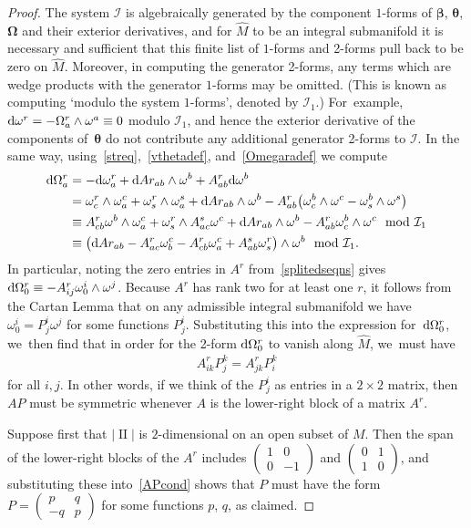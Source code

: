 \documentclass[pdftex]{sigma}
\def\vOmega{\boldsymbol{\Omega}}
\def\vbeta{\boldsymbol{\beta}}
\def\vtheta{\boldsymbol{\theta}}
\def\vOmega{\boldsymbol{\Omega}}
\def\II{\operatorname{II}} %
\def\I{\mathcal{I}}
\def\calI{\mathcal{I}}
\def\w{\omega}
\def\Mhat{\widehat{M}}
\numberwithin{equation}{section}
\begin{document}
\begin{proof}
The system $\calI$ is algebraically generated by the component $1$-forms of $\vbeta$, $\vtheta$, $\vOmega$ and their exterior derivatives, and for $\Mhat$ to be an integral submanifold it is necessary and sufficient that this finite list of $1$-forms and 2-forms pull back to be zero on $\Mhat$. Moreover, in computing the generator 2-forms, any terms which are wedge products with the generator $1$-forms may be omitted. (This is known as computing `modulo the system $1$-forms', denoted by $\calI_1$.) For~example, ${\rm d}\w^r = -\Omega^r_a \wedge \w^a \equiv 0$ modulo $\calI_1$, and hence the exterior derivative of the components of~$\vtheta$ do not contribute any additional generator 2-forms to $\I$. In the same way, using~\eqref{streq},~\eqref{vthetadef}, and~\eqref{Omegaradef} we compute
\begin{align*}
{\rm d} \Omega^r_a & = - {\rm d} \omega^r_a + {\rm d} Ar_{ab} \wedge \omega^b + A^r_{ab} {\rm d} \omega^b
\\
& = \omega^r_c \wedge \omega^c_a + \omega^r_s \wedge \omega^s_a + {\rm d} Ar_{ab} \wedge \omega^b - A^r_{ab} \big(\omega^b_c \wedge \omega^c - \omega^b_s \wedge \omega^s\big)
\\
& \equiv A^r_{cb} \omega^b \wedge \omega^c_a + \omega^r_s \wedge A^s_{ac} \omega^c + {\rm d} Ar_{ab} \wedge \omega^b - A^r_{ab} \omega^b_c \wedge \omega^c \mod \calI_1
\\
& \equiv \big( {\rm d} Ar_{ab} -A^r_{ac} \w^c_b -A^r_{cb} \w^c_a + A^s_{ab} \w^r_s\big) \wedge \w^b \mod \calI_1.
\end{align*}
In particular, noting the zero entries in $A^r$ from~\eqref{splitedseqns} gives ${\rm d} \Omega^r_0 \equiv -A^r_{ij} \w^i_0 \wedge \w^j$. Because $A^r$ has rank two for at least one $r$, it follows from the Cartan Lemma that on any admissible integral submanifold we have $\w^i_0= P^i_j \w^j$ for some functions $P^i_j$. Substituting this into the expression for~${\rm d} \Omega^r_0$, we~then find that in order for the 2-form ${\rm d} \Omega^r_0$ to vanish along $\Mhat$, we~must have
\begin{gather} \label{APcond}
A^r_{ik} P^k_j = A^r_{jk} P^k_i
\end{gather}
for all $i,j$. In other words, if we think of the $P^i_j$ as entries in a $2\times 2$ matrix, then $AP$ must be symmetric whenever $A$ is the lower-right block of a matrix $A^r$.

Suppose first that $|\II|$ is $2$-dimensional on an open subset of $M$. Then the span of the lower-right blocks of the $A^r$ includes $\left(\begin{smallmatrix} 1 & 0 \\ 0 & -1 \end{smallmatrix}\right)$ and $\left(\begin{smallmatrix} 0 & 1 \\ 1 & 0 \end{smallmatrix}\right)$, and substituting these into~\eqref{APcond} shows that $P$ must have the form $P = \left(\begin{smallmatrix} p & q \\ -q & p \end{smallmatrix}\right)$ for some functions $p$, $q$, as claimed.


\end{proof}
\end{document}
